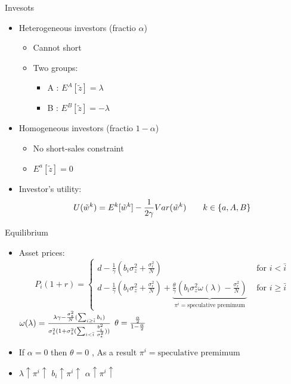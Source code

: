\documentclass{beamer}
\begin{document}
\begin{frame}{Invesots}
\begin{itemize}
\item Heterogeneous investors (fractio $ \alpha $) 
\begin{itemize}
\item Cannot short
\item Two groups:
\begin{itemize}
\item A : $ E^A[\tilde{z}] = \lambda $
\item B : $ E^B[\tilde{z}] = -\lambda $
\end{itemize}
\end{itemize}
\item Homogeneous investors (fractio $ 1-\alpha $) 
\begin{itemize}
\item No short-sales constraint
\item $ E^a[\tilde{z}] = 0 $
\end{itemize}
\item Investor's utility:
\begin{equation*}
U(\tilde{w}^k) = E^k[\tilde{w}^k] - \frac{1}{2\gamma}Var(\tilde{w}^k) \text{\qquad} k\in\{a,A,B\}
\end{equation*}
\end{itemize}
\end{frame}


\begin{frame}{Equilibrium}
\begin{itemize}
\item Asset prices:
\begin{equation*}
P_i(1+r) = \left\{\begin{array}{ll}
d - \frac{1}{\gamma}(b_i\sigma^2_z+\frac{\sigma^2_{\epsilon}}{N}) & \text{ for } i< \bar{i}\\
d - \frac{1}{\gamma}(b_i\sigma^2_z+\frac{\sigma^2_{\epsilon}}{N}) + \underbrace{\frac{\theta}{\gamma}(b_i\sigma^2_z\omega(\lambda)-\frac{\sigma^2_{\epsilon}}{N})}_{\pi^i = \text{speculative premimum}} & \text{ for } i \geq \bar{i} 
\end{array}
\right.
\end{equation*}
$\footnotesize \omega(\lambda) = \frac{\lambda\gamma - \frac{\sigma^2_z}{N}(\sum_{i\geq\bar{i}}b_i)}{\sigma^2_z(1+\sigma^2_z(\sum_{i<\bar{i}}\frac{b^2_i}{\sigma^2_{\epsilon}}))} $ \qquad $\scriptsize \theta = \frac{\frac{\alpha}{2}}{1-\frac{\alpha}{2}} $
\item If $ \alpha = 0 $ then $ \theta = 0 $ , As a result $ \pi^i = \text{speculative premimum} $
\item $\lambda  \uparrow \pi^i \uparrow $ \qquad $b_i  \uparrow \pi^i \uparrow $  \qquad $\alpha  \uparrow \pi^i \uparrow $ 
\end{itemize}
\end{frame}
\end{document}
